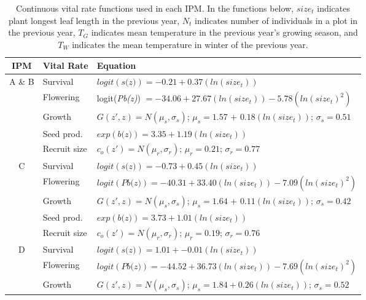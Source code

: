 \documentclass[12pt, letterpaper]{article}
\begin{document}
\begin{spacing}{1.3}
    \begin{longtable}[ht]{c|l|p{}}
    \caption{Continuous vital rate functions used in each IPM. In the functions below, $size_t$ indicates plant longest leaf length in the previous year, $N_t$ indicates number of individuals in a plot in the previous year, $T_G$ indicates mean temperature in the previous year's growing season, and $T_W$ indicates the mean temperature in winter of the previous year. 
    \label{tab:VitalRateFunctions}} \\
    \rowcolor[gray]{.95} IPM & Vital Rate & Equation  \\
        \hline
        A \& B & Survival  &   $logit(\textit{s(z)}) = -0.21 + 0.37 (ln(size_t)) $ \\
         \rowcolor[gray]{.95}& Flowering  & logit(\textit{Pb(z)})  $= -34.06 + 27.67(ln(size_t)) -5.78 (ln(size_t)^2)$ \\
         & Growth  &  $G(z',z) = N(\mu_s, \sigma_s)$; $\mu_s = 1.57$ + $0.18 (ln(size_t))$; $\sigma_s = 0.51$\\
         \rowcolor[gray]{.95}& Seed prod.  & $exp(\textit{b(z)}) = 3.35 + 1.19 (ln(size_t))$  \\
         & Recruit size  &  $c_o(z') = N(\mu_r, \sigma_r)$; $\mu_r = 0.21$; $\sigma_r = 0.77$ \\
         \hline
        \rowcolor[gray]{.95}C &   Survival  &   $logit(\textit{s(z)}) = -0.73 + 0.45 (ln(size_t)) $ \\
         & Flowering  & $logit(\textit{Pb(z)})  = -40.31 + 33.40(ln(size_t)) -7.09 (ln(size_t)^2)$ \\
         \rowcolor[gray]{.95}& Growth  &  $G(z',z) = N(\mu_s, \sigma_s)$; $\mu_s = 1.64$ + $0.11 (ln(size_t))$; $\sigma_s = 0.42$\\
         & Seed prod.  & $exp(\textit{b(z)}) = 3.73 + 1.01 (ln(size_t))$  \\
         \rowcolor[gray]{.95}& Recruit size  &  $c_o(z') = N(\mu_r, \sigma_r)$; $\mu_r = 0.19$; $\sigma_r = 0.76$ \\
         \hline
        D &  Survival  &   $logit(\textit{s(z)}) = 1.01 + -0.01 (ln(size_t)) $ \\
         \rowcolor[gray]{.95}& Flowering  & $logit(\textit{Pb(z)})  = -44.52 + 36.73(ln(size_t)) -7.69 (ln(size_t)^2)$ \\
         & Growth  &  $G(z',z) = N(\mu_s, \sigma_s)$; $\mu_s = 1.84 + 0.26(ln(size_t))$; $\sigma_s = 0.52$\\

\end{longtable}
\end{spacing}
\end{document}
